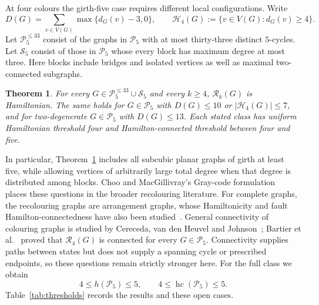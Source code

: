 \documentclass[11pt]{article}
\newtheorem{theorem}{Theorem}[section]
\theoremstyle{remark}
\newcommand{\R}{\mathcal R}
\newcommand{\Rk}{\mathcal R_k}
\newcommand{\hc}{\operatorname{hc}}
\numberwithin{equation}{section}
\numberwithin{table}{section}
\begin{document}
At four colours the girth-five case requires different local
configurations. Write
\[
 D(G)=\sum_{v\in V(G)}\max\{d_G(v)-3,0\},
 \qquad
 \mathcal H_4(G):=\{v\in V(G):d_G(v)\ge4\}.
\] Let $\mathcal P_5^{\le33}$ consist of
the graphs in $\mathcal P_5$ with at most thirty-three distinct
$5$-cycles. Let
$\mathcal S_5$ consist of those in $\mathcal P_5$ whose every block
has maximum degree at most three. Here blocks include bridges and
isolated vertices as well as maximal two-connected subgraphs.

\begin{theorem}\label{thm:main-four}
For every $G\in\mathcal P_5^{\le33}\cup\mathcal S_5$ and every $k\ge4$,
$\Rk(G)$ is Hamiltonian. The same holds for $G\in\mathcal P_5$ with
$D(G)\le10$ or $|\mathcal H_4(G)|\le7$, and for two-degenerate
$G\in\mathcal P_5$ with $D(G)\le13$. Each stated class has uniform
Hamiltonian threshold four and Hamilton-connected threshold between
four and five.
\end{theorem}

In particular, Theorem~\ref{thm:main-four} includes all subcubic planar
graphs of girth at least five, while allowing vertices of arbitrarily
large total degree when that degree is distributed among blocks.
Choo and MacGillivray's Gray-code formulation~\cite{ChMa11} places these
questions in the broader recolouring literature.  For complete graphs,
the recolouring graphs are arrangement graphs, whose Hamiltonicity and
fault Hamilton-connectedness have also been studied~\cite{HLTH04}.
General connectivity of colouring graphs is studied by Cereceda,
van den Heuvel and Johnson~\cite{CVJ08}; Bartier et al.~\cite{BBFHMP23}
proved that $\R_4(G)$ is connected for every $G\in\mathcal P_5$.
Connectivity supplies paths between states but
does not supply a spanning cycle or prescribed endpoints, so these questions
remain strictly stronger here.  For the full class we obtain
\[
4\le h(\mathcal P_5)\le5,\qquad 4\le\hc(\mathcal P_5)\le5.
\]
Table~\ref{tab:thresholds} records the results and these open cases.
\end{document}
